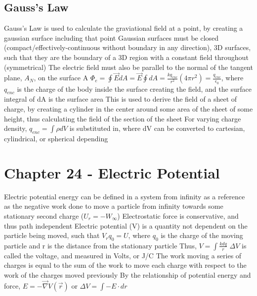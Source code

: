 \documentclass[11 pt, twoside]{article}
\newenvironment{outline*}
{
	\begin{outline}[enumerate]
	}
	{\end{outline}
}
\begin{document}
\subsection{Gauss's Law}
\begin{outline*}
\1 Gauss’s Law is used to calculate the graviational field at a point, by creating a gaussian surface including that point
\2 Gaussian surfaces must be closed (compact/effectively-continuous without boundary in any direction), 3D surfaces, such that they are the boundary of a 3D region with a constant field throughout (symmetrical)
\2 The electric field must also be parallel to the normal of the tangent plane, $A_N$, on the surface A
\2 $\Phi_e = \oint \vec{E} dA = \vec{E} \oint dA = \frac{kq_{enc}}{r^2} (4\pi r^2) = \frac{q_{enc}}{\epsilon_0}$, where $q_{enc}$ is the charge of the body inside the surface creating the field, and the surface integral of dA is the surface area
\1 This is used to derive the field of a sheet of charge, by creating a cylinder in the center around some area of the sheet of some height, thus calculating the field of the section of the sheet
\1 For varying charge density, $q_{enc} = \int \rho dV$ is substituted in, where dV can be converted to cartesian, cylindrical, or spherical depending
\end{outline*}
\section{Chapter 24 - Electric Potential}
\begin{outline*}
\1 Electric potential energy can be defined in a system from infinity as a reference as the negative work done to move a particle from infinity towards some stationary second charge ($U_r = -W_{\infty}$)
\2 Electrostatic force is conservative, and thus path independent
\2 Electric potential (V) is a quantity not dependent on the particle being moved, such that $V_rq_0 = U$, where $q_0$ is the charge of the moving particle and r is the distance from the stationary particle
\2 Thus, $V = \int \frac{kdq}{r}$
\2 $\Delta V$ is called the voltage, and measured in Volts, or J/C
\1 The work moving a series of charges is equal to the sum of the work to move each charge with respect to the work of the charges moved previously
\1 By the relationship of potential energy and force, $E = -\vec{\nabla} V(\vec{r})$ or $\Delta V = \int -E \cdot dr$
\end{outline*}
\end{document}
